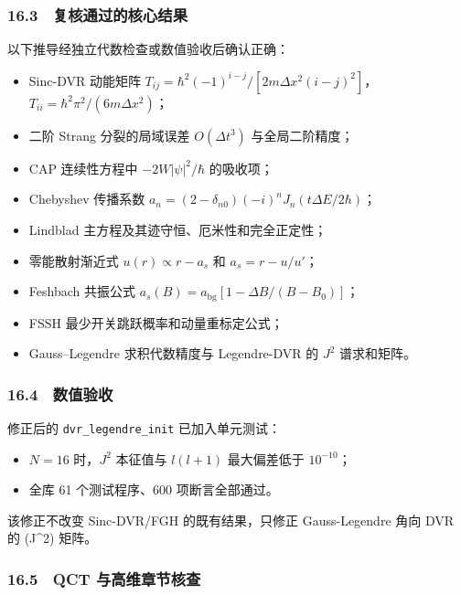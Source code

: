 \documentclass[
]{ctexbook}
\providecommand{\tightlist}{%
  \setlength{\itemsep}{0pt}\setlength{\parskip}{0pt}}
\begin{document}
\hypertarget{ux590dux6838ux901aux8fc7ux7684ux6838ux5fc3ux7ed3ux679c}{%
\subsubsection{16.3　复核通过的核心结果}\label{ux590dux6838ux901aux8fc7ux7684ux6838ux5fc3ux7ed3ux679c}}

以下推导经独立代数检查或数值验收后确认正确：

\begin{itemize}
\tightlist
\item
  Sinc-DVR 动能矩阵
  \(T_{ij}=\hbar^2(-1)^{i-j}/[2m\Delta x^2(i-j)^2]\)，\(T_{ii}=\hbar^2\pi^2/(6m\Delta x^2)\)；
\item
  二阶 Strang 分裂的局域误差 \(O(\Delta t^3)\) 与全局二阶精度；
\item
  CAP 连续性方程中 \(-2W|\psi|^2/\hbar\) 的吸收项；
\item
  Chebyshev 传播系数
  \(a_n=(2-\delta_{n0})(-i)^nJ_n(t\Delta E/2\hbar)\)；
\item
  Lindblad 主方程及其迹守恒、厄米性和完全正定性；
\item
  零能散射渐近式 \(u(r)\propto r-a_s\) 和 \(a_s=r-u/u'\)；
\item
  Feshbach 共振公式 \(a_s(B)=a_{\mathrm{bg}}[1-\Delta B/(B-B_0)]\)；
\item
  FSSH 最少开关跳跃概率和动量重标定公式；
\item
  Gauss--Legendre 求积代数精度与 Legendre-DVR 的 \(J^2\) 谱求和矩阵。
\end{itemize}

\hypertarget{ux6570ux503cux9a8cux6536}{%
\subsubsection{16.4　数值验收}\label{ux6570ux503cux9a8cux6536}}

修正后的 \texttt{dvr\_legendre\_init} 已加入单元测试：

\begin{itemize}
\tightlist
\item
  \(N=16\) 时，\(J^2\) 本征值与 \(l(l+1)\) 最大偏差低于 \(10^{-10}\)；
\item
  全库 61 个测试程序、600 项断言全部通过。
\end{itemize}

该修正不改变 Sinc-DVR/FGH 的既有结果，只修正 Gauss-Legendre 角向 DVR 的
(J\^{}2) 矩阵。

\hypertarget{qct-ux4e0eux9ad8ux7ef4ux7ae0ux8282ux6838ux67e5}{%
\subsubsection{16.5　QCT
与高维章节核查}\label{qct-ux4e0eux9ad8ux7ef4ux7ae0ux8282ux6838ux67e5}}
\end{document}
